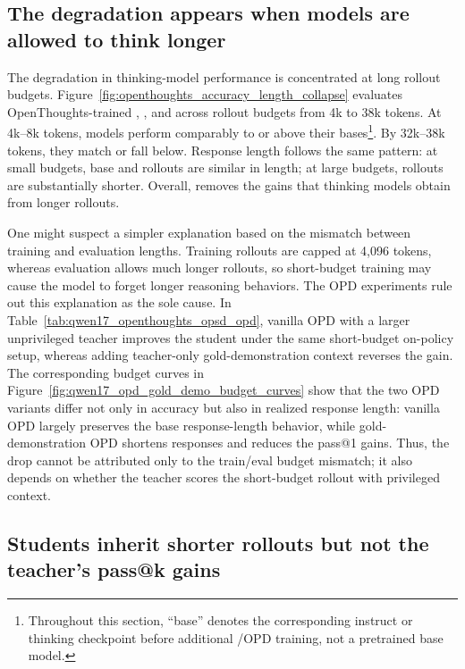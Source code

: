 \subsection{The degradation appears when models are allowed to think longer}



The degradation in thinking-model performance is concentrated at long rollout
budgets.
Figure~\ref{fig:openthoughts_accuracy_length_collapse} evaluates
OpenThoughts-trained \qwenfourb{}, \qweneightb{}, and \olmosevenbthink{} across
rollout budgets from 4k to 38k tokens. At 4k--8k tokens, \opsd{} models perform
comparably to or above their bases\footnote{Throughout this section, ``base''
denotes the corresponding instruct or thinking checkpoint before additional
\opsd{}/OPD training, not a pretrained base model.}. By 32k--38k tokens, they match or fall
below. Response length follows the same pattern: at small budgets, base and
\opsd{} rollouts are similar in length; at large budgets, \opsd{} rollouts are
substantially shorter. Overall, \opsd{} removes the gains that thinking models obtain from longer rollouts.

One might suspect a simpler explanation based on the mismatch between training
and evaluation lengths. Training rollouts are capped at 4,096 tokens, whereas
evaluation allows much longer rollouts, so short-budget training may cause the
model to forget longer reasoning behaviors. The OPD experiments rule out this
explanation as the sole cause. In
Table~\ref{tab:qwen17_openthoughts_opsd_opd}, vanilla OPD with a larger
unprivileged teacher improves the student under the same short-budget on-policy
setup, whereas adding teacher-only gold-demonstration context reverses the gain.
The corresponding budget curves in
Figure~\ref{fig:qwen17_opd_gold_demo_budget_curves} show that the two OPD
variants differ not only in accuracy but also in realized response length:
vanilla OPD largely preserves the base response-length behavior, while
gold-demonstration OPD shortens responses and reduces the pass@1 gains. Thus,
the drop cannot be attributed only to the train/eval budget mismatch; it also
depends on whether the teacher scores the short-budget rollout with privileged
context.

\subsection{Students inherit shorter rollouts but not the teacher's pass@k gains}

